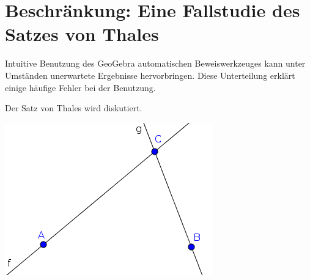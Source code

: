 \documentclass{article}
\begin{document}
\section{Beschränkung: Eine Fallstudie des Satzes von Thales}

Intuitive Benutzung des GeoGebra automatischen Beweiswerkzeuges kann unter Umständen unerwartete Ergebnisse hervorbringen. Diese Unterteilung erklärt einige häufige Fehler bei der Benutzung.

Der Satz von Thales wird diskutiert.

\begin{center}
\includegraphics[scale=0.5]{limitations-Thales1-1}
\end{center}
\end{document}
